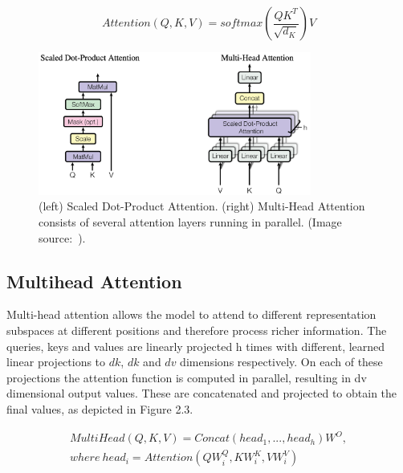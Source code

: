 \begin{equation}
	Attention(Q,K,V)=softmax(\frac{QK^T}{\sqrt{d_K}})V
	\label{equ:self_attention}
\end{equation}


\begin{figure}[!htbp]
	\centering
	\includegraphics[width = 0.8\textwidth]{figures/attention.png}
	\caption[Scaled Dot-Product Attention and Multi-Head Attention]
	{ (left) Scaled Dot-Product Attention. (right) Multi-Head Attention consists of several attention layers running in parallel. (Image source:~\cite{vaswani2017attention}).}
	\label{fig:attention}
\end{figure}

\subsection{Multihead Attention}

Multi-head attention allows the model to attend to different representation subspaces at different positions and therefore process richer information. The queries, keys and values are linearly projected h times with different, learned linear projections to $ dk $, $ dk $ and $ dv $ dimensions respectively. On each of these projections the attention function is computed in parallel, resulting in dv dimensional output values. These are concatenated and projected to obtain the final values, as depicted in Figure 2.3.

\begin{equation}
	\begin{aligned}
MultiHead(Q,K,V) = Concat(head_1,...,head_h)W^O, \\
where \ head_i = Attention(QW_i^Q,KW_i^K,VW_i^V)
\end{aligned}
\end{equation}

